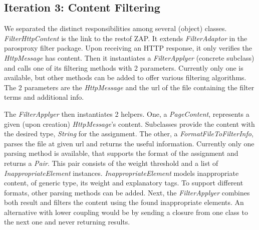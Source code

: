 \subsection{Iteration 3: Content Filtering}
We separated the distinct responsibilities among several (object) classes. \textit{FilterHttpContent} is the link to the restof ZAP. It extends \textit{FilterAdaptor} in the parosproxy filter package. Upon receiving an HTTP response, it only verifies the \textit{HttpMessage} has content. Then it instantiates a \textit{FilterApplyer} (concrete subclass) and calls one of its filtering methods with 2 parameters. Currently only one is available, but other methods can be added to offer various filtering algorithms. The 2 parameters are the \textit{HttpMessage} and the url of the file containing the filter terms and additional info.
\par
The \textit{FilterApplyer} then instantiates 2 helpers. One, a \textit{PageContent}, represents a given (upon creation) \textit{HttpMessage}'s content. Subclasses provide the content with the desired type, \textit{String} for the assignment. The other, a \textit{FormatFileToFilterInfo}, parses the file at given url and returns the useful information. Currently only one parsing method is available, that supports the format of the assignment and returns a \textit{Pair}. This pair consists of the weight threshold and a list of \textit{InappropriateElement} instances. \textit{InappropriateElement} models inappropriate content, of generic type, its weight and explanatory tags. To support different formats, other parsing methods can be added.
Next, the \textit{FilterApplyer} combines both result and filters the content using the found inappropriate elements.
An alternative with lower coupling would be by sending a closure from one class to the next one and never returning results.
